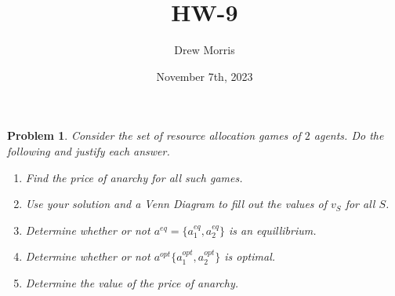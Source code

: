 \documentclass[12pt,oneside]{amsart}
\title{HW-9}
\author{Drew Morris}
\date{November 7th, 2023}
\numberwithin{equation}{section}
\numberwithin{figure}{section}
\theoremstyle{plain}
\newtheorem{prob}{Problem}
\theoremstyle{definition}
\begin{document}
\maketitle

\begin{prob}
Consider the set of resource allocation games of $2$ agents. Do the following and 
justify each answer. \\
\begin{enumerate}
  \item Find the price of anarchy for all such games. \\
  \item Use your solution and a Venn Diagram to fill out the values of $v_S$ for 
    all $S$. \\
  \item Determine whether or not $a^{eq} = \{a_1^{eq},a_2^{eq}\}$ is an equillibrium. \\
  \item Determine whether or not $a^{opt}\{a_1^{opt},a_2^{opt}\}$ is optimal. \\
  \item Determine the value of the price of anarchy. \\
\end{enumerate}
\end{prob}
\end{document}

